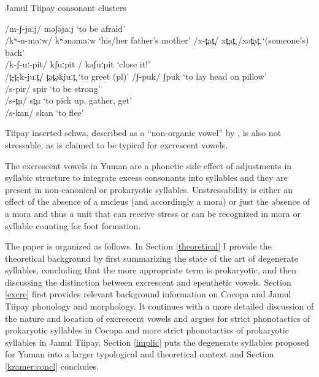 \documentclass[output=paper,colorlinks,citecolor=brown]{langscibook}
\begin{document}
\begin{exe}
    \ex Jamul Tiipay consonant clusters
    \begin{xlist}
        \ex \label{ex2a} /m-ʃ{}-jaːj/   \tab məʃəjaːj     \tab   ‘to be afraid’\\
        /kʷ{}-n-maːw/  \tab kʷənəmaːw  \tab    ‘his/her father's mother’
        \ex \label{ex2b} /x-t̪at̪/   \tab   xt̪at̪ /xət̪at̪  \tab    ‘(someone's) back’\\
        /k-ʃ{}-uː-pit/  \tab  kʃuːpit / kəʃuːpit \tab ‘close it!’\\
        /t̪-t̪-k-juːt̪/  \tab  t̪ət̪əkjuːt̪    \tab    ‘to greet (pl)’
        \ex \label{ex2c} /ʃ-puk/   \tab   ʃpuk  \tab        ‘to lay head on pillow’\\
        /s-pir/   \tab   spir    \tab      ‘to be strong’ \\
        /s-t̪u/     \tab     st̪u     \tab       ‘to pick up, gather, get’\\
        /s-kan/  \tab    skan     \tab     ‘to flee’   
    \end{xlist}
\end{exe}


Tiipay inserted schwa, described as a “non-organic vowel” by \citet{Miller2001}, is also not stressable, as is claimed to be typical for excrescent vowels. 

The excrescent vowels in Yuman are a phonetic side effect of adjustments in syllabic structure to integrate excess consonants into syllables and they are present in non-canonical or prokaryotic syllables. Unstressability is either an effect of the absence of a nucleus (and accordingly a mora) or just the absence of a mora and thus a unit that can receive stress or can be recognized in mora or syllable counting for foot formation.   

The paper is organized as follows. In Section \ref{theoretical} I provide the theoretical background by first summarizing the state of the art of degenerate syllables, concluding that the more appropriate term is prokaryotic, and then discussing the distinction between excrescent and epenthetic vowels. Section \ref{excre} first provides relevant background information on Cocopa and Jamul Tiipay phonology and morphology. It continues with a more detailed discussion of the nature and location of excrescent vowels and argues for strict phonotactics of prokaryotic syllables in Cocopa and more strict phonotactics of prokaryotic syllables in Jamul Tiipay. Section \ref{implic} puts the degenerate syllables proposed for Yuman into a larger typological and theoretical context and Section \ref{kramer:concl} concludes.
\end{document}
